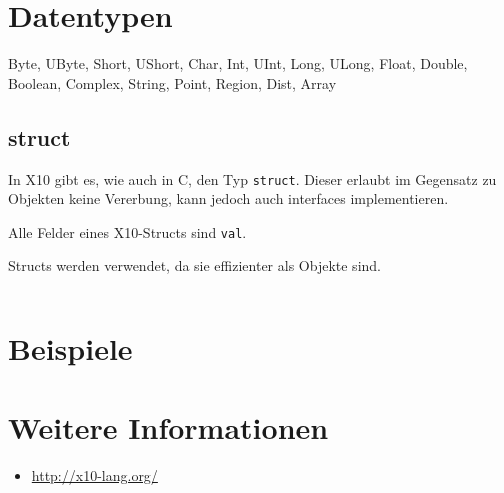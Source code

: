 \section{Datentypen}
Byte, UByte, Short, UShort, Char, Int, UInt, Long, ULong, Float, Double, Boolean, 
Complex, String, Point, Region, Dist, Array

\subsection{struct}%
In X10 gibt es, wie auch in C, den Typ \texttt{struct}. Dieser erlaubt im Gegensatz
zu Objekten keine Vererbung, kann jedoch auch interfaces implementieren.

Alle Felder eines X10-Structs sind \texttt{val}.

Structs werden verwendet, da sie effizienter als Objekte sind.

\begin{beispiel}[struct]
    \inputminted[numbersep=5pt, tabsize=4]{scala}{scripts/x10/x10-struct-example.x10}
\end{beispiel}

\section{Beispiele}

\section{Weitere Informationen}
\begin{itemize}
    \item \url{http://x10-lang.org/}
\end{itemize}
